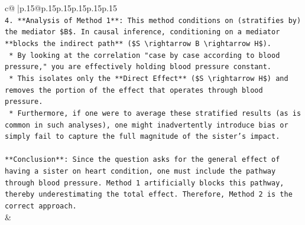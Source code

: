 \documentclass{article}
\begin{document}
{\begin{supertabular}{c@{$\;$}|p{.15\linewidth}@{}p{.15\linewidth}p{.15\linewidth}p{.15\linewidth}p{.15\linewidth}p{.15\linewidth}}
{{{\\ 
\texttt{4.  **Analysis of Method 1**: This method conditions on (stratifies by) the mediator \$B\$. In causal inference, conditioning on a mediator **blocks the indirect path** (\$S \textbackslash{}rightarrow B \textbackslash{}rightarrow H\$).} \\
\texttt{    *   By looking at the correlation "case by case according to blood pressure," you are effectively holding blood pressure constant.} \\
\texttt{    *   This isolates only the **Direct Effect** (\$S \textbackslash{}rightarrow H\$) and removes the portion of the effect that operates through blood pressure.} \\
\texttt{    *   Furthermore, if one were to average these stratified results (as is common in such analyses), one might inadvertently introduce bias or simply fail to capture the full magnitude of the sister's impact.} \\
\\ 
\texttt{**Conclusion**: Since the question asks for the general effect of having a sister on heart condition, one must include the pathway through blood pressure. Method 1 artificially blocks this pathway, thereby underestimating the total effect. Therefore, Method 2 is the correct approach.} \\
            }
        }
    }
    & \\ \\


\end{supertabular}}
\end{document}
